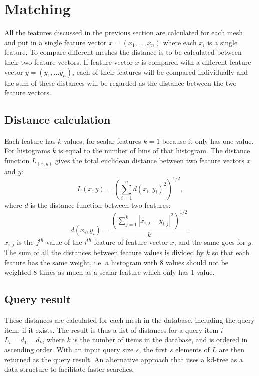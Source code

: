 \documentclass{bigdata}
\begin{document}
\section{Matching}
All the features discussed in the previous section are calculated for each mesh and put in a single feature vector $x = (x_1,...,x_n)$ where each $x_i$ is a single feature. To compare different meshes the distance is to be calculated between their two feature vectors. If feature vector $x$ is compared with a different feature vector $y = (y_1,...y_n)$, each of their features will be compared individually and the sum of these distances will be regarded as the distance between the two feature vectors.

\subsection{Distance calculation}
Each feature has $k$ values; for scalar features $k = 1$ because it only has one value. For histograms $k$ is equal to the number of bins of that histogram. The distance function $L_(x,y)$ gives the total euclidean distance between two feature vectors $x$ and $y$:
\begin{equation}
L(x,y) = \left(\sum\limits_{i=1}^nd(x_i,y_i)^2\right)^{1/2},
\end{equation}
where $d$ is the distance function between two features:
\begin{equation}
d(x_i,y_i) = \frac{\left(\sum\limits_{j=1}^k|x_{i,j}-y_{i,j}|^2\right)^{1/2}}{k}.
\end{equation}
 $x_{i,j}$ is the $j^{th}$ value of the $i^{th}$ feature of feature vector $x$, and the same goes for $y$. The sum of all the distances between feature values is divided by $k$ so that each feature has the same weight, i.e. a histogram with 8 values should not be weighted 8 times as much as a scalar feature which only has 1 value.  

\subsection{Query result}
These distances are calculated for each mesh in the database, including the query item, if it exists. The result is thus a list of distances for a query item $i$ $L_i = {d_1, ... d_k}$, where $k$ is the number of items in the database, and is ordered in ascending order. With an input query size $s$, the first $s$ elements of $L$ are then returned as the query result. An alternative approach that uses a kd-tree as a data structure to facilitate faster searches.
\end{document}
